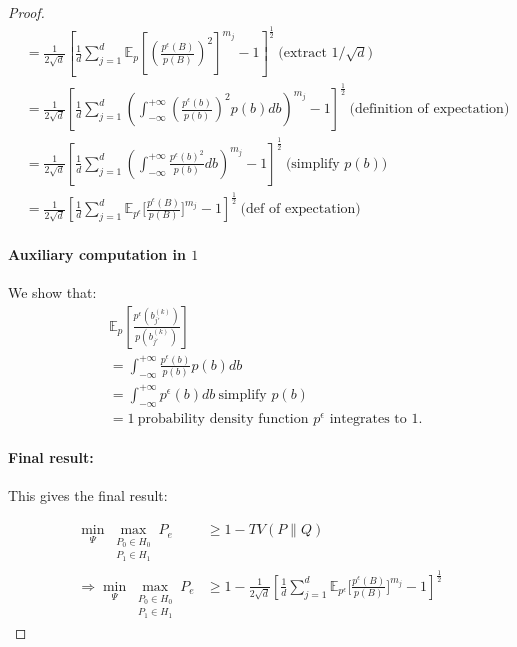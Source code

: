 \begin{proof}
\begin{align*}
         &= \frac{1}{2\sqrt{d}} 
            \left[\frac{1}{d}
            \sum_{j=1}^d 
           \mathbb{E}_p \left[\left(\frac{p^{\epsilon}(B)}{p(B)}\right)^2\right]^{m_j}
            - 1
            \right]^{\frac{1}{2}}
            ~\text{(extract $1/\sqrt{d}$)}\\
  &= \frac{1}{2\sqrt{d}}\left[\frac{1}{d}
            \sum_{j=1}^d  \left(
           \int_{-\infty}^{+\infty}\left(\frac{p^{\epsilon}(b)}{p(b)}\right)^2p(b)db\right)^{m_j}
            -1
            \right]^{\frac{1}{2}}
            ~\text{(definition of expectation)}\\
        &= \frac{1}{2\sqrt{d}}\left[\frac{1}{d}
            \sum_{j=1}^d \left(
           \int_{-\infty}^{+\infty}\frac{p^{\epsilon}(b)^2}{p(b)}db\right)^{m_j}
            -1\right]^{\frac{1}{2}}
            ~\text{(simplify $p(b)$)}\\
             &= \frac{1}{2\sqrt{d}}\left[
             \frac{1}{d}
            \sum_{j=1}^d \mathbb{E}_{p^\epsilon}\Bigg[
           \frac{p^{\epsilon}(B)}{p(B)}\Bigg]^{m_j}
            -1
            \right]^{\frac{1}{2}}
            ~\text{(def of expectation)}
\end{align*}



\paragraph{Auxiliary computation in $1$} We show that:
\begin{align*}
    &\mathbb{E}_p\left[ \frac{p^{\epsilon}(b_{j'}^{(k)})}{p(b_{j'}^{(k)})}\right]\\
    &= \int_{-\infty}^{+\infty} \frac{p^{\epsilon}(b)}{p(b)}p(b)db\\
    &= \int_{-\infty}^{+\infty} p^{\epsilon}(b)db~\text{simplify $p(b)$}\\
    &=1~\text{probability density function $p^\epsilon$ integrates to 1.}
\end{align*}



\paragraph{Final result:} This gives the final result:

\begin{align*}
    \min _{\Psi} 
    \max _{\substack{P_0 \in H_0 \\ P_1 \in H_1}}
        P_e 
        &\geq 
        1 - TV(P\parallel Q)\\
      \Rightarrow
      \min _{\Psi} 
    \max _{\substack{P_0 \in H_0 \\ P_1 \in H_1}}
        P_e 
        &\geq 1 - \frac{1}{2\sqrt{d}}\left[
             \frac{1}{d}
            \sum_{j=1}^d \mathbb{E}_{p^\epsilon}\Bigg[
           \frac{p^{\epsilon}(B)}{p(B)}\Bigg]^{m_j}
            -1
            \right]^{\frac{1}{2}}
\end{align*}
\end{proof}

